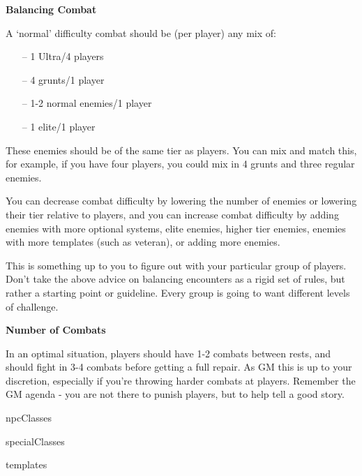 \begin{center}
    \textbf{Balancing Combat}
\end{center}

A ‘normal’ difficulty combat should be (per player) any mix of:

\begin{itemize}
    \item[--] 1 Ultra/4 players
    \item[--] 4 grunts/1 player
    \item[--] 1-2 normal enemies/1 player
    \item[--] 1 elite/1 player
\end{itemize}

These enemies should be of the same tier as players. You can mix and match this, for example, if
you have four players, you could mix in 4 grunts and three regular enemies.

You can decrease combat difficulty by lowering the number of enemies or lowering their tier
relative to players, and you can increase combat difficulty by adding enemies with more optional
systems, elite enemies, higher tier enemies, enemies with more templates (such as veteran), or
adding more enemies.

This is something up to you to figure out with your particular group of players. Don’t take the
above advice on balancing encounters as a rigid set of rules, but rather a starting point or
guideline. Every group is going to want different levels of challenge.
                 
\begin{center}
    \textbf{Number of Combats}
\end{center}

In an optimal situation, players should have 1-2 combats between rests, and should fight in 3-4
combats before getting a full repair. As GM this is up to your discretion, especially if you’re
throwing harder combats at players. Remember the GM agenda - you are not there to punish
players, but to help tell a good story.

{npcClasses}

{specialClasses}

{templates}